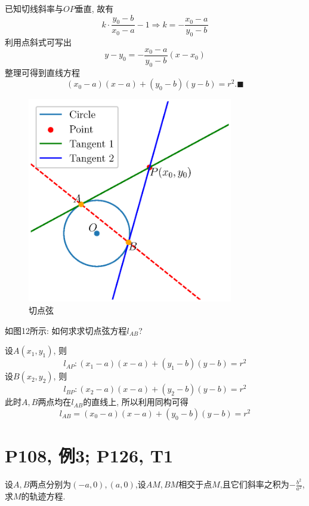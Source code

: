 \documentclass{book}
\begin{document}
    已知\textcolor[rgb]{0.75,0.17,0.22}{切线斜率与$OP$垂直}, 故有$$
        k\cdot \frac{y_0-b}{x_0-a}-1\Longrightarrow k=-\frac{x_0-a}{y_0-b}
    $$
    利用点斜式可写出$$y-y_0=-\frac{x_0-a}{y_0-b}\left( x-x_0 \right)$$
    整理可得到直线方程$$\left( x_0-a \right)\left( x-a \right)+\left( y_0-b \right)\left( y-b \right)=r^2.\blacksquare$$

    \begin{figure}[htbp]
        \centering
        \includegraphics[width=0.8\textwidth]{img/TangentOfCircle.eps}
        \caption{切点弦}
    \end{figure}

    如图12所示: 如何求求切点弦方程$l_{AB}$?

    设$A(x_1,y_1)$, 则$$l_{AP}:\left( x_1-a \right)\left( x-a \right)+\left( y_1-b \right)\left( y-b \right)=r^2$$
    设$B(x_2,y_2)$, 则$$l_{BP}:\left( x_2-a \right)\left( x-a \right)+\left( y_2-b \right)\left( y-b \right)=r^2$$
    此时$A,B$两点均在$l_{AB}$的直线上, 所以利用\textcolor[rgb]{0.75,0.17,0.22}{同构}可得$$l_{AB}=\left( x_0-a \right)\left( x-a \right)+\left( y_0-b \right)\left( y-b \right)=r^2$$
    \section{\textcolor[rgb]{0.11,0.65,0.52}{P108, 例3; P126, T1}}
    \begin{boxB}
        设$A,B$两点分别为$(-a,0),(a,0)$,设$AM,BM$相交于点$M$,且它们斜率之积为$\displaystyle -\frac{b^2}{a^2}$, 求$M$的轨迹方程.
    \end{boxB}
\end{document}
